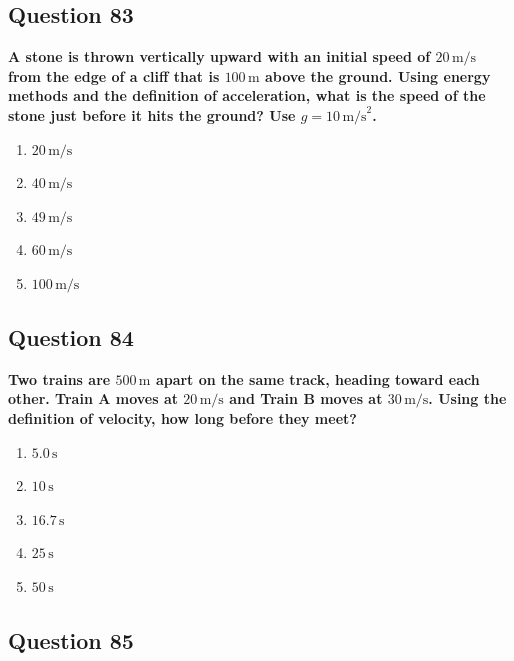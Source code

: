 \documentclass[12pt,letterpaper]{article}
\begin{document}
\subsection{Question 83}

\begin{questionbox}
\textbf{A stone is thrown vertically upward with an initial speed of $20\,\text{m/s}$ from the edge of a cliff that is $100\,\text{m}$ above the ground. Using energy methods and the definition of acceleration, what is the speed of the stone just before it hits the ground? Use $g = 10\,\text{m/s}^2$.}

\begin{enumerate}[label=\alph*)]
    \item $20\,\text{m/s}$
    \item $40\,\text{m/s}$
    \item $49\,\text{m/s}$
    \item $60\,\text{m/s}$
    \item $100\,\text{m/s}$
\end{enumerate}
\end{questionbox}

\subsection{Question 84}

\begin{questionbox}
\textbf{Two trains are $500\,\text{m}$ apart on the same track, heading toward each other. Train A moves at $20\,\text{m/s}$ and Train B moves at $30\,\text{m/s}$. Using the definition of velocity, how long before they meet?}

\begin{enumerate}[label=\alph*)]
    \item $5.0\,\text{s}$
    \item $10\,\text{s}$
    \item $16.7\,\text{s}$
    \item $25\,\text{s}$
    \item $50\,\text{s}$
\end{enumerate}
\end{questionbox}

\subsection{Question 85}
\end{document}
